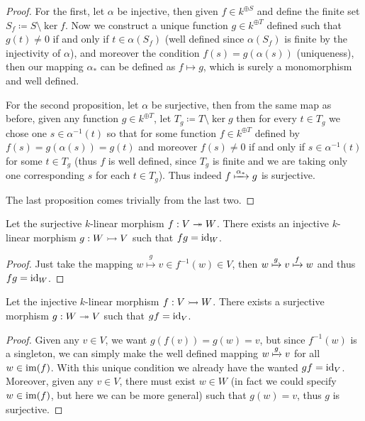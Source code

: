 \begin{proof}
For the first, let \(\alpha\) be injective, then given \(f \in k^{\oplus S}\)
and define the finite set \(S_f \coloneq S \setminus \ker f\). Now we construct a
unique function \(g \in k^{\oplus T}\) defined such that \(g(t) \neq 0\) if and only if
\(t \in \alpha(S_f)\) (well defined since \(\alpha(S_f)\) is finite by the
injectivity of \(\alpha\)), and moreover the condition \(f(s) =
g(\alpha(s))\) (uniqueness), then our mapping \(\alpha_{\ast}\) can be
defined as \(f \mapsto g\), which is surely a monomorphism and well defined.

For the second proposition, let \(\alpha\) be surjective, then from the same
map as before, given any function \(g \in k^{\oplus T}\), let  \(T_g \coloneq T
\setminus \ker g\) then for every \(t \in T_g\) we chose one \(s \in
\alpha^{-1}(t)\) so that for some function \(f \in k^{\oplus T}\) defined by
\(f(s) = g(\alpha(s)) = g(t)\) and moreover \(f(s) \neq 0\) if and only if \(s \in
\alpha^{-1}(t)\) for some \(t \in T_g\) (thus \(f\) is well defined, since
\(T_g\) is finite and we are taking only one corresponding \(s\) for each \(t
\in T_g\)). Thus indeed \(f \xmapsto{\alpha_\ast} g\) is surjective.

The last proposition comes trivially from the last two.
\end{proof}

\begin{proposition}
Let the surjective \(k\)-linear morphism \(f: V \twoheadrightarrow W\). There
exists an injective \(k\)-linear morphism \(g: W \rightarrowtail V\) such
that \(f  g = \operatorname{id}_{W}\).
\end{proposition}

\begin{proof}
Just take the mapping \(w \overset g \longmapsto v \in f^{-1}(w) \in V\), then
\(w \xmapsto g v \xmapsto f w\) and thus \(f  g = \operatorname{id}_W\).
\end{proof}

\begin{proposition}
Let the injective \(k\)-linear morphism \(f: V \rightarrowtail W\). There
exists a surjective morphism \(g : W \twoheadrightarrow V\) such that \(g
  f = \operatorname{id}_V\).
\end{proposition}

\begin{proof}
Given any \(v \in V\), we want \(g(f(v)) = g(w) = v\), but since \(f^{-1}(w)\)
is a singleton, we can simply make the well defined mapping \(w \xmapsto g v\)
for all \(w \in \operatorname{im}(f)\). With this unique condition we already have the
wanted \(g  f = \operatorname{id}_V\). Moreover, given any \(v \in V\), there must
exist \(w \in W\) (in fact we could specify \(w \in \operatorname{im}(f)\), but here we can
be more general) such that \(g(w) = v\), thus \(g\) is surjective.
\end{proof}

